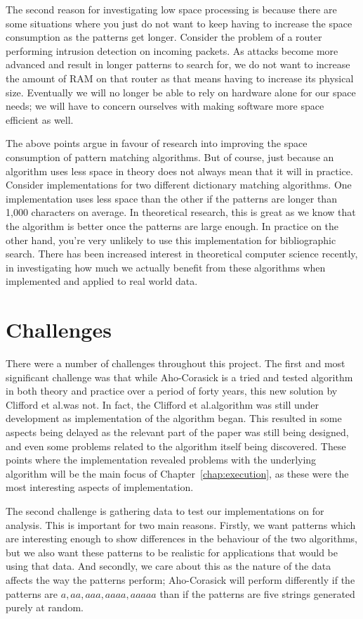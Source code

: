 \documentclass[ %
                    author={Dominic Joseph Moylett},
                    degree={MEng},
                     title={Dictionary Matching with Fingerprints},
                  subtitle={An Empirical Analysis},
                      type={research},
                      year={2015} ]{dissertation}
\begin{document}
The second reason for investigating low space processing is because there are some situations where you just do not want to keep having to increase the space consumption as the patterns get longer. Consider the problem of a router performing intrusion detection on incoming packets. As attacks become more advanced and result in longer patterns to search for, we do not want to increase the amount of RAM on that router as that means having to increase its physical size. Eventually we will no longer be able to rely on hardware alone for our space needs; we will have to concern ourselves with making software more space efficient as well.

The above points argue in favour of research into improving the space consumption of pattern matching algorithms. But of course, just because an algorithm uses less space in theory does not always mean that it will in practice. Consider implementations for two different dictionary matching algorithms. One implementation uses less space than the other if the patterns are longer than 1,000 characters on average. In theoretical research, this is great as we know that the algorithm is better once the patterns are large enough. In practice on the other hand, you're very unlikely to use this implementation for bibliographic search. There has been increased interest in theoretical computer science recently, in investigating how much we actually benefit from these algorithms when implemented and applied to real world data.

\section{Challenges}
\label{sec:challenges}

There were a number of challenges throughout this project. The first and most significant challenge was that while Aho-Corasick is a tried and tested algorithm in both theory and practice over a period of forty years, this new solution by Clifford et al.\@ was not. In fact, the Clifford et al.\@ algorithm was still under development as implementation of the algorithm began. This resulted in some aspects being delayed as the relevant part of the paper was still being designed, and even some problems related to the algorithm itself being discovered. These points where the implementation revealed problems with the underlying algorithm will be the main focus of Chapter~\ref{chap:execution}, as these were the most interesting aspects of implementation.

The second challenge is gathering data to test our implementations on for analysis. This is important for two main reasons. Firstly, we want patterns which are interesting enough to show differences in the behaviour of the two algorithms, but we also want these patterns to be realistic for applications that would be using that data. And secondly, we care about this as the nature of the data affects the way the patterns perform; Aho-Corasick will perform differently if the patterns are $a, aa, aaa, aaaa, aaaaa$ than if the patterns are five strings generated purely at random.
\end{document}
